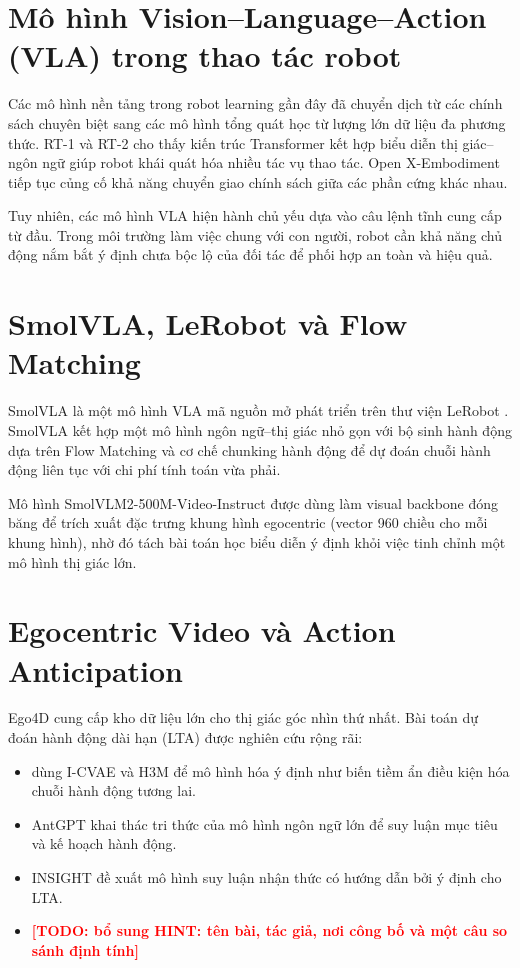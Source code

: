 \documentclass[12pt,a4paper]{report}
\newcommand{\TODO}[1]{\textcolor{red}{\textbf{[TODO: #1]}}}
\begin{document}
\section{Mô hình Vision--Language--Action (VLA) trong thao tác robot}

Các mô hình nền tảng trong robot learning gần đây đã chuyển dịch từ các chính sách chuyên biệt sang các mô hình tổng quát học từ lượng lớn dữ liệu đa phương thức. RT-1 \citep{brohan2022rt1} và RT-2 \citep{zitkovich2023rt2} cho thấy kiến trúc Transformer kết hợp biểu diễn thị giác--ngôn ngữ giúp robot khái quát hóa nhiều tác vụ thao tác. Open X-Embodiment \citep{openx2024} tiếp tục củng cố khả năng chuyển giao chính sách giữa các phần cứng khác nhau.

Tuy nhiên, các mô hình VLA hiện hành chủ yếu dựa vào câu lệnh tĩnh cung cấp từ đầu. Trong môi trường làm việc chung với con người, robot cần khả năng chủ động nắm bắt ý định chưa bộc lộ của đối tác để phối hợp an toàn và hiệu quả.

\section{SmolVLA, LeRobot và Flow Matching}

SmolVLA \citep{shukor2025smolvla} là một mô hình VLA mã nguồn mở phát triển trên thư viện LeRobot \citep{cadene2026lerobot}. SmolVLA kết hợp một mô hình ngôn ngữ--thị giác nhỏ gọn với bộ sinh hành động dựa trên Flow Matching \citep{lipman2023flow} và cơ chế chunking hành động để dự đoán chuỗi hành động liên tục với chi phí tính toán vừa phải.

Mô hình SmolVLM2-500M-Video-Instruct \citep{marafioti2025smolvlm,huggingface2025smolvlm2} được dùng làm visual backbone đóng băng để trích xuất đặc trưng khung hình egocentric (vector 960 chiều cho mỗi khung hình), nhờ đó tách bài toán học biểu diễn ý định khỏi việc tinh chỉnh một mô hình thị giác lớn.

\section{Egocentric Video và Action Anticipation}

Ego4D \citep{grauman2022ego4d} cung cấp kho dữ liệu lớn cho thị giác góc nhìn thứ nhất. Bài toán dự đoán hành động dài hạn (LTA) được nghiên cứu rộng rãi:
\begin{itemize}
    \item \citet{mascaro2023intention} dùng I-CVAE và H3M để mô hình hóa ý định như biến tiềm ẩn điều kiện hóa chuỗi hành động tương lai.
    \item AntGPT \citep{zhao2024antgpt} khai thác tri thức của mô hình ngôn ngữ lớn để suy luận mục tiêu và kế hoạch hành động.
    \item INSIGHT \citep{chu2026insight} đề xuất mô hình suy luận nhận thức có hướng dẫn bởi ý định cho LTA.
    \item \TODO{bổ sung HINT: tên bài, tác giả, nơi công bố và một câu so sánh định tính}
\end{itemize}
\end{document}
